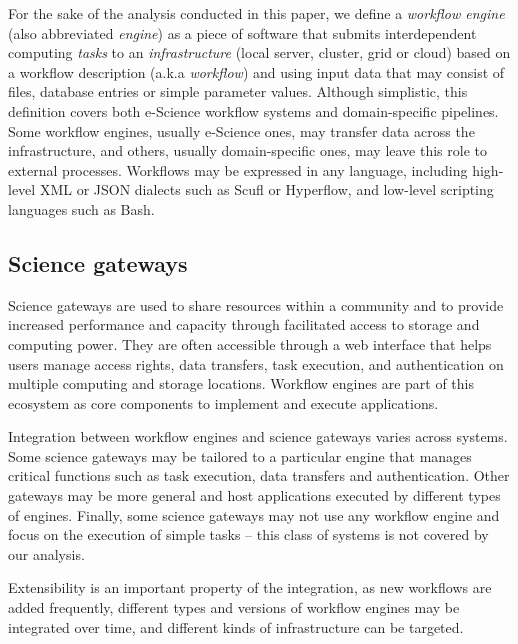 \documentclass[preprint,3p,twocolumn]{elsarticle}
\newcommand{\note}[2]{\pdfmargincomment[color=yellow,author=#1,open=true]{#2}}
\newcommand{\closednote}[4]{} %
\begin{document}
For the sake of the analysis conducted in this paper, we define a
\emph{workflow engine} (also abbreviated \emph{engine}) as a piece of
software that submits interdependent computing \emph{tasks} to an
\emph{infrastructure} (local server, cluster, grid or cloud) based on
a workflow description (a.k.a \emph{workflow}) and using input data
that may consist of files, database entries or simple parameter
values. Although simplistic, this definition covers both e-Science workflow systems and
domain-specific pipelines.\closednote{Marc-e}{To remain consistent with above descriptions}{Tristan}{yes!} Some workflow engines, usually e-Science
ones, may transfer data across the infrastructure, and others, usually
domain-specific ones, may leave this role to external processes. Workflows
may be expressed in any language, including high-level XML or JSON
dialects such as Scufl or Hyperflow, and low-level scripting languages
such as Bash.

\subsection{Science gateways}

Science gateways are used to share resources within a community and to
provide increased performance and capacity through facilitated access
to storage and computing power. They are often accessible through a
web interface that helps users manage access rights, data transfers,
task execution, and authentication on multiple computing and storage
locations. Workflow engines are part of this ecosystem as core
components to implement and execute applications.


Integration between workflow engines and science gateways varies
across systems. Some science gateways may be tailored to a particular
engine that manages critical functions such as task execution, data
transfers and authentication. Other gateways may be more general and
host applications executed by different types of engines. Finally,
some science gateways may not use any workflow engine and focus on the
execution of simple tasks -- this class of systems is not covered by
our analysis.

Extensibility is an important property of the integration, as new
workflows are added frequently, different types and versions of
workflow engines may be integrated over time, and different kinds of
infrastructure can be targeted.
\end{document}
